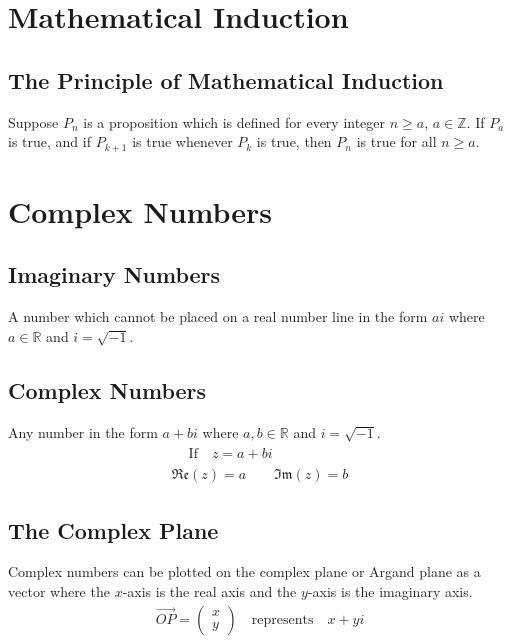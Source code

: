\documentclass[10pt, a4paper, titlepage]{article}
\newcommand{\mbb}[1]{\mathbb{#1}}
\begin{document}
\begin{multicols*}{3}
	\hrulefill


\section{Mathematical Induction}
	\subsection{The Principle of Mathematical Induction}
	Suppose $P_n$ is a proposition which is defined for every integer $n\geq a$, $a\in \mbb{Z}$. If $P_a$ is true, and if $P_{k+1}$ is true whenever $P_k$ is true, then $P_n$ is true for all $n\geq a$.

	\hrulefill


\section{Complex Numbers}
	\subsection{Imaginary Numbers}
	A number which cannot be placed on a real number line in the form $ai$ where $a\in \mbb{R}$ and $i=\sqrt{-1}$.\\

	\dotfill
	\subsection{Complex Numbers}
	Any number in the form $a+bi$ where $a,b\in \mbb{R}$ and $i=\sqrt{-1}$.
	\begin{gather}
		\begin{flalign}
			&\text{If}\quad z=a+bi&&
		\end{flalign}\\
		\mathfrak{Re} (z)=a\qquad \mathfrak{Im} (z)=b
	\end{gather}

	\dotfill
	\subsection{The Complex Plane}
	Complex numbers can be plotted on the complex plane or Argand plane as a vector where the $x$-axis is the real axis and the $y$-axis is the imaginary axis.
	\begin{align}
		\overrightarrow{OP}=\begin{pmatrix}x\\ y\end{pmatrix}\quad \text{represents}\quad x+yi
	\end{align}
	\dotfill

\end{multicols*}
\end{document}
